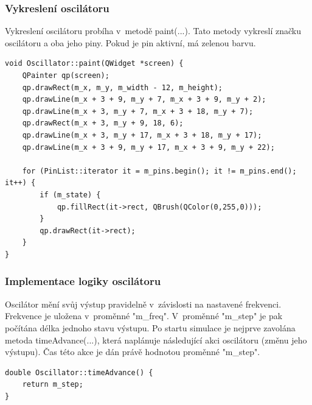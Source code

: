 \subsubsection{Vykreslení oscilátoru }

Vykreslení oscilátoru probíha v~metodě paint(...). Tato metody vykreslí značku oscilátoru a oba jeho piny. Pokud je pin aktivní, má zelenou barvu.

\begin{lstlisting}
void Oscillator::paint(QWidget *screen) {
	QPainter qp(screen);
	qp.drawRect(m_x, m_y, m_width - 12, m_height);
	qp.drawLine(m_x + 3 + 9, m_y + 7, m_x + 3 + 9, m_y + 2);
	qp.drawLine(m_x + 3, m_y + 7, m_x + 3 + 18, m_y + 7);
	qp.drawRect(m_x + 3, m_y + 9, 18, 6);
	qp.drawLine(m_x + 3, m_y + 17, m_x + 3 + 18, m_y + 17);
	qp.drawLine(m_x + 3 + 9, m_y + 17, m_x + 3 + 9, m_y + 22);

	for (PinList::iterator it = m_pins.begin(); it != m_pins.end(); it++) {
		if (m_state) {
			qp.fillRect(it->rect, QBrush(QColor(0,255,0)));
		}
		qp.drawRect(it->rect);
	}
}
\end{lstlisting}

\subsubsection{Implementace logiky oscilátoru}

Oscilátor mění svůj výstup pravidelně v~závislosti na nastavené frekvenci. Frekvence je uložena v~proměnné "m\_freq". V~proměnné "m\_step" je pak počítána délka jednoho stavu výstupu. Po startu simulace je nejprve zavolána metoda timeAdvance(...), která naplánuje následující akci oscilátoru (změnu jeho výstupu). Čas této akce je dán právě hodnotou proměnné "m\_step".

\begin{lstlisting}
double Oscillator::timeAdvance() {
	return m_step;
}
\end{lstlisting}

